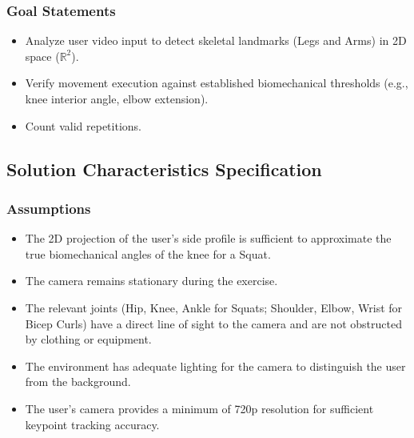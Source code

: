 \documentclass[12pt]{article}
\newcounter{assumpnum} %
\newcounter{goalnum} %
\begin{document}
\subsubsection{Goal Statements}
\begin{itemize}
\item[GS\refstepcounter{goalnum}\thegoalnum \label{G_Landmarks}:] Analyze user video input to detect skeletal landmarks (Legs and Arms) in 2D space ($\mathbb{R}^2$).
\item[GS\refstepcounter{goalnum}\thegoalnum \label{G_Verify}:] Verify movement execution against established biomechanical thresholds (e.g., knee interior angle, elbow extension).
\item[GS\refstepcounter{goalnum}\thegoalnum \label{G_Repetition}:] Count valid repetitions.
\end{itemize}

\subsection{Solution Characteristics Specification}

\subsubsection{Assumptions} \label{sec_assumpt}
\begin{itemize}
\item[A\refstepcounter{assumpnum}\theassumpnum \label{A_2D}:] The 2D projection of the user's side profile is sufficient to approximate the true biomechanical angles of the knee for a Squat.
\item[A\refstepcounter{assumpnum}\theassumpnum \label{A_Camera}:] The camera remains stationary during the exercise.
\item[A\refstepcounter{assumpnum}\theassumpnum \label{A_Visibility}:] The relevant joints (Hip, Knee, Ankle for Squats; Shoulder, Elbow, Wrist for Bicep Curls) have a direct line of sight to the camera and are not obstructed by clothing or equipment.
\item[A\refstepcounter{assumpnum}\theassumpnum \label{A_Lighting}:] The environment has adequate lighting for the camera to distinguish the user from the background.
\item[A\refstepcounter{assumpnum}\theassumpnum \label{A_Resolution}:] The user's camera provides a minimum of 720p resolution for sufficient keypoint tracking accuracy.
\end{itemize}
\end{document}
